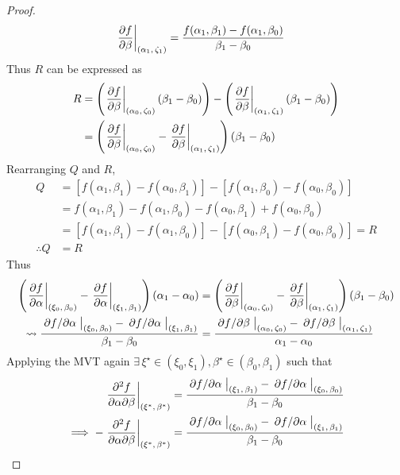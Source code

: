 \begin{lemma}
\begin{proof}
\begin{align*}
			\eval{\pdv{f}{\beta}}_{\point{\alpha_1}{\zeta_1}}&=\frac{f(\alpha_1,\beta_1)-f(\alpha_1,\beta_0)}{\beta_1-\beta_0}
		\end{align*}
		Thus $R$ can be expressed as
		\begin{align*}
			R&=\left(\eval{\pdv{f}{\beta}}_{\point{\alpha_0}{\zeta_0}}\left(\beta_1-\beta_0\right)\right)-\left(\eval{\pdv{f}{\beta}}_{\point{\alpha_1}{\zeta_1}}\left(\beta_1-\beta_0\right)\right)\\
			&=\left(\eval{\pdv{f}{\beta}}_{\point{\alpha_0}{\zeta_0}}-\eval{\pdv{f}{\beta}}_{\point{\alpha_1}{\zeta_1}}\right)\left(\beta_1-\beta_0\right)
		\end{align*}
		Rearranging $Q$ and $R$,
		\begin{align*}
			Q&=[f(\alpha_1,\beta_1)-f(\alpha_0,\beta_1)]-[f(\alpha_1,\beta_0)-f(\alpha_0,\beta_0)]\\
			&=f(\alpha_1,\beta_1)-f(\alpha_1,\beta_0)-f(\alpha_0,\beta_1)+f(\alpha_0,\beta_0)\\
			&=[f(\alpha_1,\beta_1)-f(\alpha_1,\beta_0)]-[f(\alpha_0,\beta_1)-f(\alpha_0,\beta_0)]=R\\
			\therefore Q&=R
		\end{align*}
		Thus
		\begin{align}
			\notag\left(\eval{\pdv{f}{\alpha}}_{\point{\xi_0}{\beta_0}}-\eval{\pdv{f}{\alpha}}_{\point{\xi_1}{\beta_1}}\right)\left(\alpha_1-\alpha_0\right)&=\left(\eval{\pdv{f}{\beta}}_{\point{\alpha_0}{\zeta_0}}-\eval{\pdv{f}{\beta}}_{\point{\alpha_1}{\zeta_1}}\right)\left(\beta_1-\beta_0\right)\\
			\label{proof:SYMMETRY}\leadsto\frac{\eval{\pdv*{f}{\alpha}}_{\point{\xi_0}{\beta_0}}-\eval{\pdv*{f}{\alpha}}_{\point{\xi_1}{\beta_1}}}{\beta_1-\beta_0}&=\frac{\eval{\pdv*{f}{\beta}}_{\point{\alpha_0}{\zeta_0}}-\eval{\pdv*{f}{\beta}}_{\point{\alpha_1}{\zeta_1}}}{\alpha_1-\alpha_0}
		\end{align}
		Applying the MVT again $\exists\,\xi^\star\in(\xi_0,\xi_1),\beta^\star\in(\beta_0,\beta_1)$ such that
		\begin{align*}
			\eval{\pdv{f}{\alpha}{\beta}}_{\point{\xi^\star}{\beta^\star}}&=\frac{\eval{\pdv*{f}{\alpha}}_{\point{\xi_1}{\beta_1}}-\eval{\pdv*{f}{\alpha}}_{\point{\xi_0}{\beta_0}}}{\beta_1-\beta_0}\\
			\implies-\eval{\pdv{f}{\alpha}{\beta}}_{\point{\xi^\star}{\beta^\star}}&=\frac{\eval{\pdv*{f}{\alpha}}_{\point{\xi_0}{\beta_0}}-\eval{\pdv*{f}{\alpha}}_{\point{\xi_1}{\beta_1}}}{\beta_1-\beta_0}
		\end{align*}

\end{proof}
\end{lemma}
